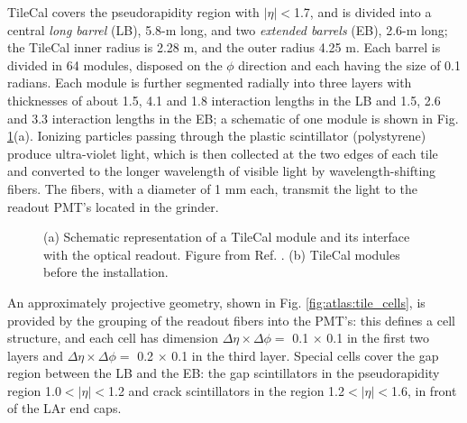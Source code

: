 TileCal covers the pseudorapidity region with $|\eta|<$1.7, and is divided into a central \textit{long barrel} (LB), 5.8-m long, and two \textit{extended barrels} (EB), 2.6-m long; the TileCal inner radius is 2.28 m, and the outer radius 4.25 m. Each barrel is divided in 64 modules, disposed on the $\phi$ direction and each having the size of 0.1 radians. Each module is further segmented radially into three layers with thicknesses of about 1.5, 4.1 and 1.8 interaction lengths in the LB and 1.5, 2.6 and 3.3 interaction lengths in the EB; a schematic of one module is shown in Fig. \ref{fig:atlas:tile}(a). Ionizing particles passing through the plastic scintillator (polystyrene) produce ultra-violet light, which is then collected at the two edges of each tile and converted to the longer wavelength of visible light by wavelength-shifting fibers. The fibers, with a diameter of 1 mm each, transmit the light to the readout PMT's located in the grinder.

\begin{figure}[ht]
\centering
{}
\caption{(a) Schematic representation of a TileCal module and its interface with the optical readout. Figure from Ref. \cite{atlas:atlas}. (b) TileCal modules before the installation.}
\label{fig:atlas:tile}
\end{figure}

An approximately projective geometry, shown in Fig. \ref{fig:atlas:tile_cells}, is provided by the grouping of the readout fibers into the PMT's: this defines a cell structure, and each cell has dimension $\Delta\eta \times \Delta\phi = $ 0.1 $\times$ 0.1 in the first two layers and $\Delta\eta \times \Delta\phi = $ 0.2 $\times$ 0.1 in the third layer. Special cells cover the gap region between the LB and the EB: the gap scintillators in the pseudorapidity region 1.0$<|\eta|<$1.2 and crack scintillators in the region 1.2$<|\eta|<$1.6, in front of the LAr end caps.

